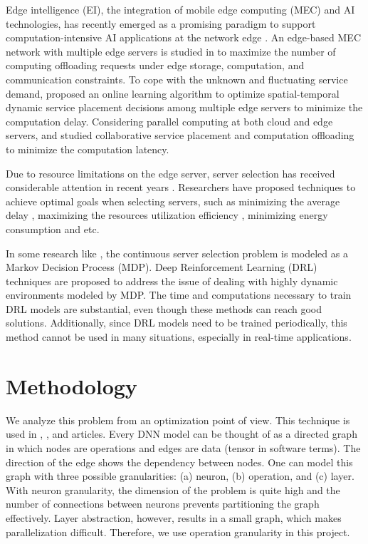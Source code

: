 \documentclass[lettersize,journal]{IEEEtran}
\begin{document}
Edge intelligence (EI), the integration of mobile edge computing (MEC) and AI technologies, has recently emerged as a promising paradigm to support computation-intensive AI applications at the network edge \cite{9442308}.
An edge-based MEC network with multiple edge servers is studied in \cite{8737385} to maximize the number of computing offloading requests under edge storage, computation, and communication constraints. To cope with the unknown and fluctuating service demand,\cite{8509631} proposed an online learning algorithm to optimize spatial-temporal dynamic service placement decisions among multiple edge servers to minimize the computation delay. Considering parallel computing at both cloud and edge servers, \cite{xu2018joint} and \cite{chen2019collaborative} studied collaborative service placement and computation offloading to minimize the computation latency.

Due to resource limitations on the edge server, server selection has received considerable attention in recent years \cite{9599379}. 
Researchers have proposed techniques to achieve optimal goals when selecting servers, such as minimizing the average delay \cite{8972932},
maximizing the resources utilization efficiency \cite{8823875}, minimizing energy consumption \cite{li2020energy} and etc.

In some research like \cite{liu2021deep}, the continuous server selection problem is modeled as a Markov Decision Process (MDP). Deep Reinforcement Learning (DRL) techniques are proposed to address the issue of dealing with highly dynamic environments modeled by MDP. The time and computations necessary to train DRL models are substantial, even though these methods can reach good solutions.  Additionally, since DRL models need to be trained periodically, this method cannot be used in many situations, especially in real-time applications. 

\section{Methodology}
We analyze this problem from an optimization point of view. This technique is used in \cite{DBLP:journals/corr/abs-2006-16423}, \cite{9527097}, and \cite{9512507} articles. Every DNN model can be thought of as a directed graph in which nodes are operations and edges are data (tensor in software terms). The direction of the edge shows the dependency between nodes. One can model this graph with three possible granularities: (a) neuron, (b) operation, and (c) layer. With neuron granularity, the dimension of the problem is quite high and the number of connections between neurons prevents partitioning the graph effectively. Layer abstraction, however, results in a small graph, which makes parallelization difficult. Therefore, we use operation granularity in this project. 
\end{document}
